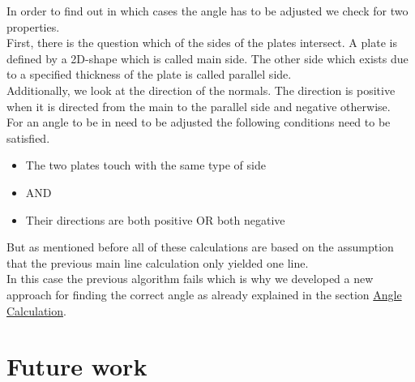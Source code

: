 \documentclass[../ClassicThesis.tex]{subfiles}
\begin{document}
In order to find out in which cases the angle has to be adjusted we check for two properties.\\
First, there is the question which of the sides of the plates intersect. A plate is defined by a 2D-shape which is called main side. The other side which exists due to a specified thickness of the plate is called parallel side.\\
Additionally, we look at the direction of the normals. The direction is positive when it is directed from the main to the parallel side and negative otherwise.\\
For an angle to be in need to be adjusted the following conditions need to be satisfied.
\begin{itemize}
    \item The two plates touch with the same type of side 
    \item[] AND
    \item Their directions are both positive OR both negative
\end{itemize}
But as mentioned before all of these calculations are based on the assumption that the previous main line calculation only yielded one line.\\
In this case the previous algorithm fails which is why we developed a new approach for finding the correct angle as already explained in the section \hyperref[angleCalculation]{Angle Calculation}.

\section{Future work}
\end{document}
